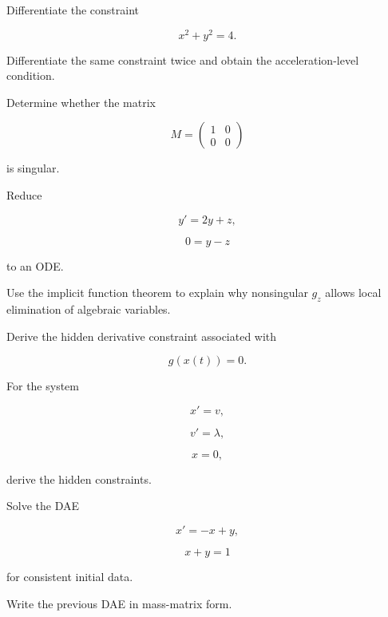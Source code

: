 \begin{exercise}[2]
Differentiate the constraint

\[
x^2+y^2=4.
\]
\end{exercise}

\begin{exercise}[2]
Differentiate the same constraint twice and obtain the acceleration-level
condition.
\end{exercise}

\begin{exercise}[2]
Determine whether the matrix

\[
M
=
\begin{pmatrix}
1&0\\
0&0
\end{pmatrix}
\]

is singular.
\end{exercise}

\begin{exercise}[2]
Reduce

\[
y'=2y+z,
\]

\[
0=y-z
\]

to an ODE.
\end{exercise}

\begin{exercise}[3]
Use the implicit function theorem to explain why nonsingular \(g_z\)
allows local elimination of algebraic variables.
\end{exercise}

\begin{exercise}[3]
Derive the hidden derivative constraint associated with

\[
g(x(t))=0.
\]
\end{exercise}

\begin{exercise}[3]
For the system

\[
x'=v,
\]

\[
v'=\lambda,
\]

\[
x=0,
\]

derive the hidden constraints.
\end{exercise}

\begin{exercise}[3]
Solve the DAE

\[
x'=-x+y,
\]

\[
x+y=1
\]

for consistent initial data.
\end{exercise}

\begin{exercise}[3]
Write the previous DAE in mass-matrix form.
\end{exercise}

